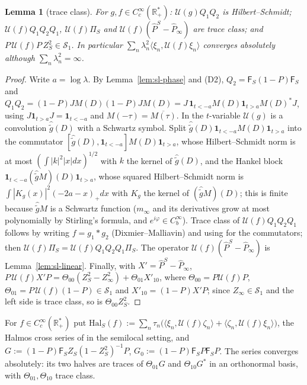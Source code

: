 \documentclass[11pt]{amsart}
\newtheorem{lemma}[theorem]{Lemma}
\theoremstyle{definition}
\theoremstyle{remark}
\newcommand{\R}{\mathbb R}
\begin{document}
\begin{lemma}[trace class]\label{lem:sl-TC}
For $g,f\in C_c^\infty(\R_+^*)$: $\mathcal U(g)Q_1Q_2$ is Hilbert--Schmidt; $\mathcal U(f)Q_1Q_2Q_1$, $\mathcal U(f)\Pi_S$ and
$\mathcal U(f)(\widehat P^S-\widehat P_\infty)$ are trace class; and $P\,\mathcal U(f)P\,Z_S^2\in\mathcal S_1$. In particular
$\sum_n\lambda_n^2\langle\xi_n,\mathcal U(f)\xi_n\rangle$ converges absolutely although $\sum_n\lambda_n^2=\infty$.
\end{lemma}
\begin{proof}
Write $a=\log\lambda$. By Lemma~\ref{lem:sl-phase} and (D2), $Q_2=\mathsf F_S(1-P)\mathsf F_S$ and
$Q_1Q_2=(1-P)JM(D)(1-P)JM(D)=J\,\mathbf 1_{t<-a}M(D)\mathbf 1_{t>a}M(D)^*J$, using $J\mathbf 1_{t>a}J=\mathbf 1_{t<-a}$ and
$M(-\tau)=\overline{M(\tau)}$. In the $t$-variable $\mathcal U(g)$ is a convolution $\widehat{\tilde g}(D)$ with a Schwartz symbol.
Split $\widehat{\tilde g}(D)\mathbf 1_{t<-a}M(D)\mathbf 1_{t>a}$ into the commutator $[\widehat{\tilde g}(D),\mathbf 1_{t<-a}]M(D)\mathbf 1_{t>a}$,
whose Hilbert--Schmidt norm is at most $(\int|k|^2|x|dx)^{1/2}$ with $k$ the kernel of $\widehat{\tilde g}(D)$, and the
Hankel block $\mathbf 1_{t<-a}(\widehat{\tilde g}M)(D)\mathbf 1_{t>a}$, whose squared Hilbert--Schmidt norm is
$\int|K_g(x)|^2(-2a-x)_+dx$ with $K_g$ the kernel of $(\widehat{\tilde g}M)(D)$; this is finite because
$\widehat{\tilde g}M$ is a Schwartz function ($m_\infty$ and its derivatives grow at most polynomially by Stirling's formula,
and $e^{i\varphi}\in C_b^\infty$). Trace class of $\mathcal U(f)Q_1Q_2Q_1$ follows by writing $f=g_1*g_2$ (Dixmier--Malliavin)
and using \cite[Lemma~D.1]{ConnesConsani2021} for the commutators; then $\mathcal U(f)\Pi_S=\mathcal U(f)Q_1Q_2Q_1\Pi_S$. The
operator $\mathcal U(f)(\widehat P^S-\widehat P_\infty)$ is Lemma~\ref{lem:sl-linear}. Finally, with $X'=\widehat P^S-\widehat P_\infty$,
$P\,\mathcal U(f)X'P=\Theta_{00}(Z_S^2-Z_\infty^2)+\Theta_{01}X'_{10}$, where $\Theta_{00}=P\mathcal U(f)P$,
$\Theta_{01}=P\,\mathcal U(f)(1-P)\in\mathcal S_1$ \cite[Thm.~4.5]{Simon2005} and $X'_{10}=(1-P)X'P$; since $Z_\infty\in\mathcal S_1$ and
the left side is trace class, so is $\Theta_{00}Z_S^2$.
\end{proof}

For $f\in C_c^\infty(\R_+^*)$ put
$\mathrm{Hal}_S(f):=\sum_n\tau_n\big(\langle\xi_n,\mathcal U(f)\zeta_n\rangle+\langle\zeta_n,\mathcal U(f)\xi_n\rangle\big)$, the Halmos cross series of
\cite[(84)]{ConnesConsani2021} in the semilocal setting, and $G:=(1-P)\mathsf F_SZ_S(1-Z_S^2)^{-1}P$, $G_0:=(1-P)\mathsf F_SP\mathsf F_SP$.
The series converges absolutely: its two halves are traces of $\Theta_{01}G$ and $\Theta_{10}G^*$ in an orthonormal
basis, with $\Theta_{01},\Theta_{10}$ trace class.
\end{document}
